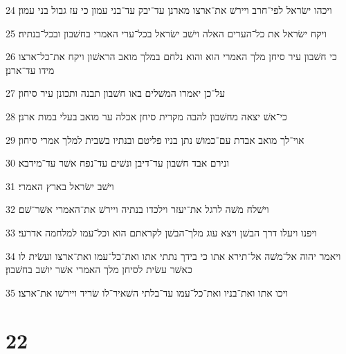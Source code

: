 \par 24 ויכהו ישׂראל לפי־חרב ויירשׁ את־ארצו מארנן עד־יבק עד־בני עמון כי עז גבול בני עמון׃
\par 25 ויקח ישׂראל את כל־הערים האלה וישׁב ישׂראל בכל־ערי האמרי בחשׁבון ובכל־בנתיה׃
\par 26 כי חשׁבון עיר סיחן מלך האמרי הוא והוא נלחם במלך מואב הראשׁון ויקח את־כל־ארצו מידו עד־ארנן׃
\par 27 על־כן יאמרו המשׁלים באו חשׁבון תבנה ותכונן עיר סיחון׃
\par 28 כי־אשׁ יצאה מחשׁבון להבה מקרית סיחן אכלה ער מואב בעלי במות ארנן׃
\par 29 אוי־לך מואב אבדת עם־כמושׁ נתן בניו פליטם ובנתיו בשׁבית למלך אמרי סיחון׃
\par 30 ונירם אבד חשׁבון עד־דיבן ונשׁים עד־נפח אשׁר עד־מידבא׃
\par 31 וישׁב ישׂראל בארץ האמרי׃
\par 32 וישׁלח משׁה לרגל את־יעזר וילכדו בנתיה ויירשׁ את־האמרי אשׁר־שׁם׃
\par 33 ויפנו ויעלו דרך הבשׁן ויצא עוג מלך־הבשׁן לקראתם הוא וכל־עמו למלחמה אדרעי׃
\par 34 ויאמר יהוה אל־משׁה אל־תירא אתו כי בידך נתתי אתו ואת־כל־עמו ואת־ארצו ועשׂית לו כאשׁר עשׂית לסיחן מלך האמרי אשׁר יושׁב בחשׁבון׃
\par 35 ויכו אתו ואת־בניו ואת־כל־עמו עד־בלתי השׁאיר־לו שׂריד ויירשׁו את־ארצו׃

\chapter{22}

